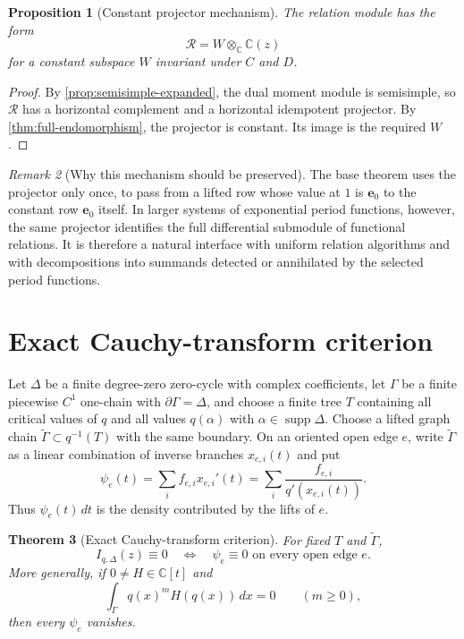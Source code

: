 \documentclass[11pt]{article}
\numberwithin{equation}{section}
\newtheorem{theorem}{Theorem}[section]
\newtheorem{proposition}[theorem]{Proposition}
\theoremstyle{definition}
\theoremstyle{remark}
\newtheorem{remark}[theorem]{Remark}
\newcommand{\C}{\mathbb C}
\newcommand{\Rcal}{\mathcal R}
\begin{document}
\begin{proposition}[Constant projector mechanism]
The relation module has the form
\[
  \Rcal=W\otimes_\C\C(z)
\]
for a constant subspace $W$ invariant under $C$ and $D$.
\end{proposition}

\begin{proof}
By \cref{prop:semisimple-expanded}, the dual moment module is semisimple, so
$\Rcal$ has a horizontal complement and a horizontal idempotent projector.
By \cref{thm:full-endomorphism}, the projector is constant.  Its image is the
required $W$.
\end{proof}

\begin{remark}[Why this mechanism should be preserved]
The base theorem uses the projector only once, to pass from a lifted row whose
value at $1$ is $\mathbf e_0$ to the constant row $\mathbf e_0$ itself.  In
larger systems of exponential period functions, however, the same
projector identifies the full differential submodule of functional relations.
It is therefore a natural interface with uniform relation algorithms and
with decompositions into summands detected or annihilated by the selected
period functions.
\end{remark}

\section{Exact Cauchy-transform criterion}

Let $\Delta$ be a finite degree-zero zero-cycle with complex coefficients,
let $\Gamma$ be a finite piecewise $C^1$ one-chain with
$\partial\Gamma=\Delta$, and choose a finite tree $T$ containing all critical values of $q$ and all values $q(\alpha)$ with
$\alpha\in\operatorname{supp}\Delta$.  Choose a lifted graph chain
$\widetilde\Gamma\subset q^{-1}(T)$ with the same boundary.  On an oriented
open edge $e$, write $\widetilde\Gamma$ as a linear combination of inverse
branches $x_{e,i}(t)$ and put
\[
  \psi_e(t)=\sum_i f_{e,i}x_{e,i}'(t)
  =\sum_i\frac{f_{e,i}}{q'(x_{e,i}(t))}.
\]
Thus $\psi_e(t)\,dt$ is the density contributed by the lifts of $e$.

\begin{theorem}[Exact Cauchy-transform criterion]
\label{thm:edge-exact}
For fixed $T$ and $\widetilde\Gamma$,
\[
  I_{q,\Delta}(z)\equiv0
  \quad\Longleftrightarrow\quad
  \psi_e\equiv0\text{ on every open edge }e.
\]
More generally, if $0\ne H\in\C[t]$ and
\[
  \int_\Gamma q(x)^mH(q(x))\,dx=0
  \qquad(m\ge0),
\]
then every $\psi_e$ vanishes.
\end{theorem}
\end{document}
